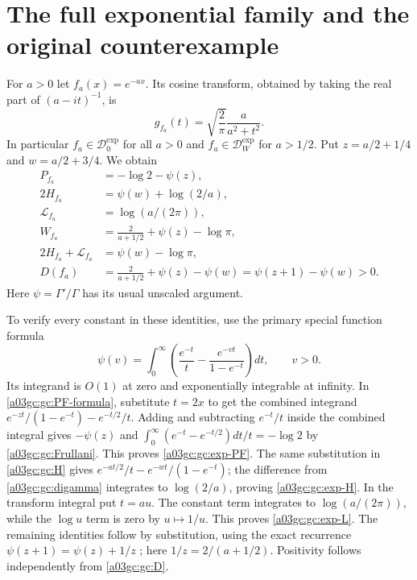 \section{The full exponential family and the original counterexample}

For $a>0$ let $f_a(x)=e^{-ax}$.  Its cosine transform, obtained by taking
the real part of $(a-it)^{-1}$, is
\begin{equation}
 g_{f_a}(t)=\sqrt{\frac2\pi}\frac{a}{a^2+t^2}.
 \label{a03gc:gc:exponential-transform}
\end{equation}
In particular $f_a\in\mathcal D_0^{\exp}$ for all $a>0$ and
$f_a\in\mathcal D_W^{\exp}$ for $a>1/2$.
Put $z=a/2+1/4$ and $w=a/2+3/4$.  We obtain
\begin{align}
 P_{f_a}&=-\log2-\psi(z),\label{a03gc:gc:exp-PF}\\
 2H_{f_a}&=\psi(w)+\log(2/a),\label{a03gc:gc:exp-H}\\
 \mathscr L_{f_a}&=\log(a/(2\pi)),\label{a03gc:gc:exp-L}\\
 W_{f_a}&=\frac{2}{a+1/2}+\psi(z)-\log\pi,
 \label{a03gc:gc:exp-W}\\
 2H_{f_a}+\mathscr L_{f_a}&=\psi(w)-\log\pi,
 \label{a03gc:gc:exp-right}\\
 D(f_a)&=\frac{2}{a+1/2}+\psi(z)-\psi(w)
       =\psi(z+1)-\psi(w)>0.
 \label{a03gc:gc:exp-D}
\end{align}
Here $\psi=\Gamma'/\Gamma$ has its usual unscaled argument.

To verify every constant in these identities, use the primary special
function formula \cite[5.9.12]{a03gc:dlmf}
\begin{equation}
 \psi(v)=\int_0^\infty
 \left(\frac{e^{-t}}t-\frac{e^{-vt}}{1-e^{-t}}\right)dt,
 \qquad v>0.
 \label{a03gc:gc:digamma}
\end{equation}
Its integrand is $O(1)$ at zero and exponentially integrable at infinity.
In \eqref{a03gc:gc:PF-formula}, substitute $t=2x$ to get the combined
integrand $e^{-zt}/(1-e^{-t})-e^{-t/2}/t$.
Adding and subtracting $e^{-t}/t$ inside the combined integral gives
$-\psi(z)$ and
$\int_0^\infty(e^{-t}-e^{-t/2})dt/t=-\log2$ by
\eqref{a03gc:gc:Frullani}.  This proves \eqref{a03gc:gc:exp-PF}.
The same substitution in \eqref{a03gc:gc:H} gives
$e^{-at/2}/t-e^{-wt}/(1-e^{-t})$; the difference from
\eqref{a03gc:gc:digamma} integrates to $\log(2/a)$, proving
\eqref{a03gc:gc:exp-H}.
In the transform integral put $t=au$.  The constant term integrates to
$\log(a/(2\pi))$, while the $\log u$ term is zero by $u\mapsto1/u$.
This proves \eqref{a03gc:gc:exp-L}.  The remaining identities follow by
substitution, using the exact recurrence
$\psi(z+1)=\psi(z)+1/z$ \cite[5.5.2]{a03gc:dlmf}; here
$1/z=2/(a+1/2)$.  Positivity follows independently from \eqref{a03gc:gc:D}.

